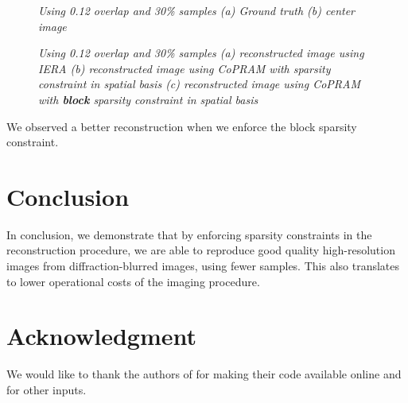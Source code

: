 \documentclass{article} %
\begin{document}
\begin{figure}[!t]
	\centering
	\caption{\sl Using 0.12 overlap and 30\% samples (a) Ground truth (b) center image } \label{fig:b_recons1}
\end{figure}


\begin{figure}[!h]
	\centering
	\caption{\sl Using 0.12 overlap and 30\% samples (a) reconstructed image using IERA (b) reconstructed image using CoPRAM with sparsity constraint in spatial basis (c) reconstructed image using CoPRAM with \textbf{block} sparsity constraint in spatial basis} \label{fig:b_recons2}
\end{figure}

We observed a better reconstruction when we enforce the block sparsity constraint.
\section{Conclusion}
In conclusion, we demonstrate that by enforcing sparsity constraints in the reconstruction procedure, we are able to reproduce good quality high-resolution images from diffraction-blurred images, using fewer samples. This also translates to lower operational costs of the imaging procedure. 


\section*{Acknowledgment}
We would like to thank the authors of \cite{holloway2016toward} for making their code available online and for other inputs.



  
\end{document}
